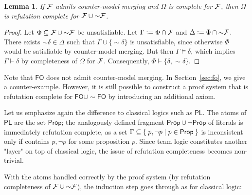 \documentclass[a4paper,english,fleqn,11pt,final]{scrartcl}
\newcommand{\negg}{{\sim}}
\newcommand{\logic}[1]{\ensuremath{\mathsf{#1}}\xspace}
\newcommand{\PS}{\logic{Prop}}
\newcommand{\PL}{\logic{PL}}
\newcommand{\FO}{\logic{FO}}
\newcommand{\calF}{\protect\ensuremath{\mathcal{F}}}
\providecommand{\dfn}{\mathrel{\mathop:}=}
\theoremstyle{plain}
\newtheorem{lemma}[theorem]{Lemma}
\theoremstyle{definition}
\begin{document}
\begin{lemma}\label{lem:model-existence1}
If $\calF$ admits counter-model merging and $\Omega$ is complete for $\calF$, then $\Omega$ is refutation complete for $\calF \cup \negg \calF$.
\end{lemma}
\begin{proof}
Let $\Phi \subseteq \calF \cup \negg \calF$ be unsatisfiable.
Let $\Gamma \dfn \Phi \cap \calF$ and $\Delta \dfn \Phi \cap \negg\calF$.
There exists $\negg \delta \in \Delta$ such that $\Gamma \cup \{\negg\delta\}$ is unsatisfiable, since otherwise $\Phi$ would be satisfiable by counter-model merging.
But then $\Gamma \vDash \delta$, which implies $\Gamma \vdash \delta$ by completeness of $\Omega$ for $\calF$.
Consequently, $\Phi \vdash \{\delta, \negg\delta\}$.
\end{proof}


Note that $\FO$ does not admit counter-model merging.
In Section~\ref{sec:fo}, we give a counter-example.
However, it is still possible to construct a proof system that is refutation complete for $\FO \cup \negg \FO$ by introducing an additional axiom.

\medskip

Let us emphasize again the difference to classical logics such as $\PL$.
The atoms of $\PL$ are the set $\PS$; the analogously defined fragment $\PS \cup \neg \PS$ of literals is immediately refutation complete, as a set $\Gamma \subseteq \Set{ p, \neg p | p \in \PS }$ is inconsistent only if contains $p, \neg p$ for some proposition $p$.
Since team logic constitutes another "layer" on top of classical logic, the issue of refutation completeness becomes non-trivial.

\medskip

With the atoms handled correctly by the proof system (by refutation completeness of $\calF \cup \negg \calF$), the induction step goes through as for classical logic:
\end{document}
